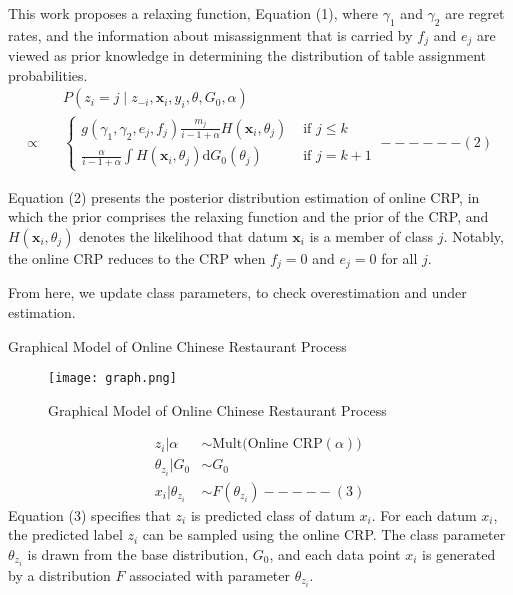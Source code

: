 \documentclass[11pt]{beamer}
\begin{document}
	\begin{frame}
		This work proposes a relaxing function, Equation (1), where $\gamma_1$ and $\gamma_2$ are regret rates, and the information about misassignment that is carried by $f_j$ and $e_j$ are viewed as prior knowledge in determining the distribution of table assignment probabilities.
		$$
		\begin{aligned}
			& P\left(z_i=j \mid z_{-i}, \mathbf{x}_i, y_i, \theta, G_0, \alpha\right) \\
			\propto \quad & \begin{cases}g\left(\gamma_1, \gamma_2, e_j, f_j\right) \frac{m_j}{i-1+\alpha} H\left(\mathbf{x}_i, \theta_j\right) & \text { if } j \leq k \\
				\frac{\alpha}{i-1+\alpha} \int H\left(\mathbf{x}_i, \theta_j\right) \mathrm{d} G_0\left(\theta_j\right) & \text { if } j=k+1\end{cases}------ (2)
		\end{aligned}
		$$
		
		Equation (2) presents the posterior distribution estimation of online CRP, in which the prior comprises the relaxing function and the prior of the CRP, and $H\left(\mathbf{x}_i, \theta_j\right)$ denotes the likelihood that datum $\mathbf{x}_i$ is a member of class $j$. Notably, the online CRP reduces to the CRP when $f_j=0$ and $e_j=0$ for all $j$.
		
		From here, we update class parameters, to check overestimation and under estimation. 
		
		Graphical Model of Online Chinese Restaurant
		Process
	\end{frame}

\begin{frame}
	\begin{figure}
		\centering
		\texttt{[image: graph.png]} 
		\caption{Graphical Model of Online Chinese Restaurant
			Process}
		\label{fig: Source: https://www.scribbr.com/ai-tools/machine-learning/} %
	\end{figure}

\begin{equation*}
	\begin{aligned}
		z_i|\alpha &\sim \text{Mult(Online CRP}(\alpha)) \\
		\theta_{z_i}|G_0 &\sim G_0 \\
		x_i|\theta_{z_i} &\sim F(\theta_{z_i})----- (3)
	\end{aligned}
\end{equation*}
Equation (3) specifies that $z_i$ is predicted class of datum $x_i$. For each datum $x_i$, the predicted label $z_i$ can be sampled using the online CRP. The class parameter $\theta_{z_i}$ is drawn from the base distribution, $G_0$, and each data point $x_i$ is generated by a distribution $F$ associated with parameter $\theta_{z_i}$.

\end{frame}
\end{document}

